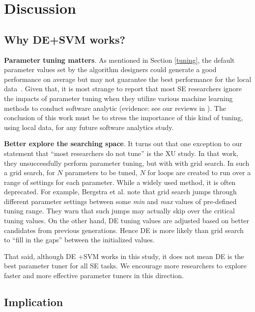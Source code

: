 \documentclass[sigconf]{acmart}
\theoremstyle{break}
\begin{document}
 
\section{Discussion}\label{discussion}

\subsection{Why DE+SVM works?}

\textbf{Parameter tuning matters}. As mentioned in Section \ref{tuning}, the default parameter values set by the algorithm designers could generate a good performance on average but may not guarantee the best performance for the local data~\cite{bergstra2012random,fu2016tuning}. Given that,
it is most strange to report that  most SE researchers ignore the impacts of
parameter tuning when they utilize various machine learning methods to conduct software analytic (evidence: see our reviews in \cite{fu2016tuning,fu2016differential,agrawal2016wrong}). 
The conclusion of this work must be to stress the importance of this kind of tuning, using local data, for any future software analytics study.
 

\textbf{Better explore the searching space}.  It turns out that one exception to our statement that ``most researchers do not tune''
is the XU study. In that work, they unsuccessfully perform parameter tuning, but with with grid search. In such a grid search, for $N$ parameters to be tuned, $N$ for loops are created
to run over a range of settings for each parameter. While a widely used method,  it is often deprecated. For example,  Bergstra et al.\cite{bergstra2012random} note that  grid search jumps through different parameter settings between some {\it min} and {\it max} values of pre-defined tuning range. They warn that such jumps may actually
skip over the  critical tuning values. On the other hand, DE tuning values are adjusted based on better candidates from previous generations. Hence DE is more likely than grid search to ``fill in the gaps'' between the initialized values. 

That said, although DE +SVM works in this study, it does not mean DE is the best parameter tuner for all SE tasks. We encourage more researchers to explore faster and more effective parameter tuners in this direction.
 
\subsection{Implication}
\end{document}
